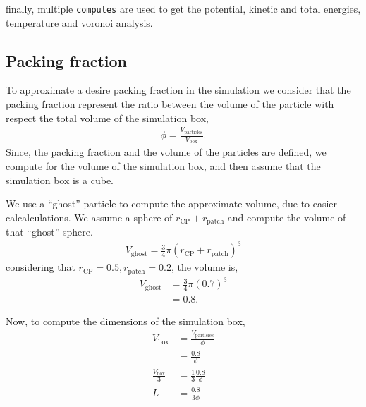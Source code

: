 \documentclass[../main.tex]{subfiles}
\begin{document}
finally, multiple \verb|computes| are used to get the potential, kinetic and total energies, temperature and voronoi analysis.

\subsection{Packing fraction}

To approximate a desire packing fraction in the simulation we consider that the packing fraction represent the ratio between the volume of the particle with respect the total volume of the simulation box,
\begin{gather*}
    \phi = \frac{V_{\mathrm{particles}}}{V_\mathrm{box}}.
\end{gather*}
Since, the packing fraction and the volume of the particles are defined, we compute for the volume of the simulation box, and then assume that the simulation box is a cube.

We use a ``ghost'' particle to compute the approximate volume, due to easier calcalculations.
We assume a sphere of $r_{\mathrm{CP}}+r_{\mathrm{patch}}$ and compute the volume of that ``ghost'' sphere.
\begin{gather*}
    V_{\mathrm{ghost}} = \frac{3}{4}\pi (r_{\mathrm{CP}}+r_{\mathrm{patch}})^{3}
\end{gather*}
considering that $r_{\mathrm{CP}}=0.5, r_{\mathrm{patch}}=0.2$, the volume is,
\begin{align*}
    V_{\mathrm{ghost}} &= \frac{3}{4}\pi (0.7)^{3} \\
                       &= 0.8.
\end{align*}

Now, to compute the dimensions of the simulation box,
\begin{align*}
    V_\mathrm{box} &= \frac{V_{\mathrm{particles}}}{\phi} \\
                   &= \frac{0.8}{\phi} \\
    \frac{V_\mathrm{box}}{3}&= \frac{1}{3}\frac{0.8}{\phi} \\
    L &= \frac{0.8}{3\phi}
\end{align*}
\end{document}
